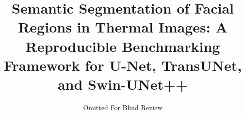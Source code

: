 \documentclass[conference]{IEEEtran}
\begin{document}
\title{Semantic Segmentation of Facial Regions in Thermal Images: A Reproducible Benchmarking Framework for U-Net, TransUNet, and Swin-UNet++
}

\author{Omitted For Blind Review}

\maketitle
\end{document}
